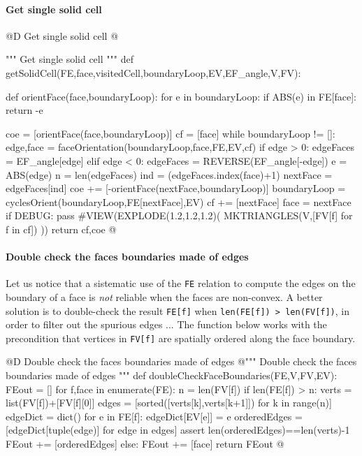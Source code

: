 \documentclass[11pt,oneside]{article}    %
\begin{document}
\paragraph{Get single solid cell}

@D Get single solid cell
@{""" Get single solid cell """
def getSolidCell(FE,face,visitedCell,boundaryLoop,EV,EF_angle,V,FV):

    def orientFace(face,boundaryLoop): 
        for e in boundaryLoop:
            if ABS(e) in FE[face]: return -e

    coe = [orientFace(face,boundaryLoop)]
    cf = [face] 
    while boundaryLoop != []:
        edge,face = faceOrientation(boundaryLoop,face,FE,EV,cf)
        if edge > 0: edgeFaces = EF_angle[edge]
        elif edge < 0: edgeFaces = REVERSE(EF_angle[-edge])
        e = ABS(edge)
        n = len(edgeFaces)
        ind = (edgeFaces.index(face)+1)%
        nextFace = edgeFaces[ind]
        coe += [-orientFace(nextFace,boundaryLoop)]
        boundaryLoop = cyclesOrient(boundaryLoop,FE[nextFace],EV)
        cf += [nextFace] 
        face = nextFace
    if DEBUG: pass
        #VIEW(EXPLODE(1.2,1.2,1.2)( MKTRIANGLES(V,[FV[f] for f in cf]) ))
    return cf,coe
@}

\paragraph{Double check the faces boundaries made of edges}
Let us notice that a sistematic use of the \texttt{FE} relation to compute the edges on the boundary of a face is \emph{not} reliable when the faces are non-convex. A better solution is to double-check the result \texttt{FE[f]} when \texttt{len(FE[f]) > len(FV[f])}, in order to filter out the spurious edges ...
The function below works with the precondition that vertices in \texttt{FV[f]} are spatially ordered along the face boundary.

@D Double check the faces boundaries made of edges
@{""" Double check the faces boundaries made of edges """
def doubleCheckFaceBoundaries(FE,V,FV,EV):
    FEout = []
    for f,face in enumerate(FE):
        n = len(FV[f])
        if len(FE[f]) > n:
            verts = list(FV[f])+[FV[f][0]]
            edges = [sorted([verts[k],verts[k+1]]) for k in range(n)]
            edgeDict = dict()
            for e in FE[f]: edgeDict[EV[e]] = e
            orderedEdges = [edgeDict[tuple(edge)] for edge in edges]
            assert len(orderedEdges)==len(verts)-1
            FEout += [orderedEdges]
        else:
            FEout += [face]
    return FEout
@}
\end{document}
